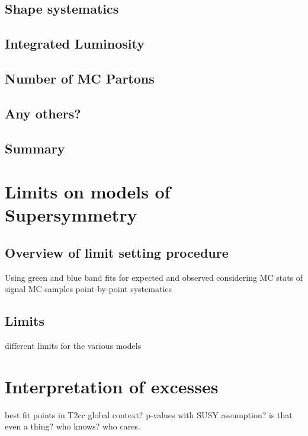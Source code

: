 \subsection{Shape systematics}
\subsection{Integrated Luminosity}
\subsection{Number of MC Partons}
\subsection{Any others?}
\subsection{Summary}

\section{Limits on models of Supersymmetry}  %
\label{sec:interpretation_limits}

\subsection{Overview of limit setting procedure}
Using green and blue band fits for expected and observed
considering MC stats of signal MC samples
point-by-point systematics

\subsection{Limits}
different limits for the various models


\section{Interpretation of excesses}
\label{sec:interpretation_excess}
best fit points in T2cc
global context?
p-values with SUSY assumption? is that even a thing? who knows? who cares.